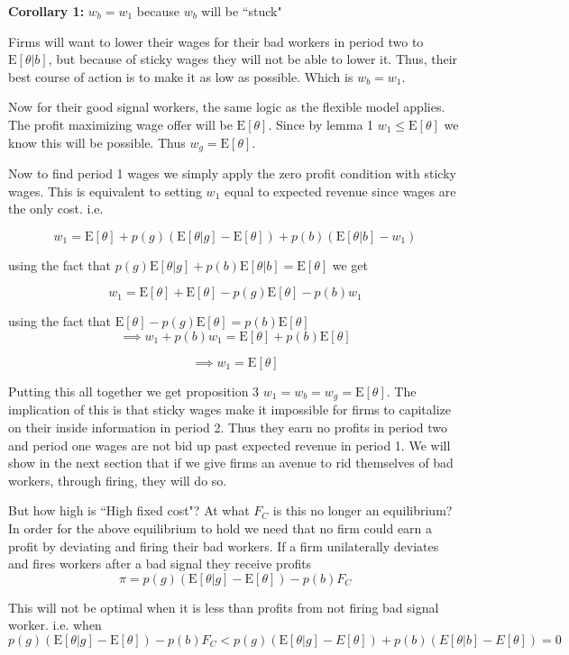 \documentclass[11pt]{article}
\newcommand{\E}{\mathrm{E}}
\begin{document}
 \textbf{Corollary 1:} $w_b = w_1$ because $w_b$ will be ``stuck"

Firms will want to lower their wages for their bad workers in period two to $\E[\theta |b]$, but because of sticky wages they will not be able to lower it. Thus, their best course of action is to make it as low as possible. Which is $w_b = w_1$. \par 

Now for their good signal workers, the same logic as the flexible model applies. The profit maximizing wage offer will be $\E[\theta]$. Since by lemma 1  $w_1 \leq \E[\theta]$ we know this will be possible. Thus $w_g = \E[\theta]$. \par 

Now to find period 1 wages we simply apply the zero profit condition with sticky wages. This is equivalent to setting $w_1$ equal to expected revenue since wages are the only cost. i.e. 

$$ w_1 = \E[\theta] + p(g)(\E[\theta|g] - \E[\theta]) + p(b)(\E[\theta|b] - w_1) $$

using the fact that $p(g)\E[\theta|g] + p(b)\E[\theta|b] = \E[\theta]$ we get 

$$ w_1 = \E[\theta] + \E[\theta] - p(g)\E[\theta] - p(b)w_1$$

using the fact that $ \E[\theta] - p(g)\E[\theta] = p(b)\E[\theta]$
$$ \implies w_1 +p(b)w_1 = \E[\theta] + p(b)\E[\theta]
$$

$$ \implies w_1 = \E[\theta]$$

Putting this all together we get proposition 3 $w_1 = w_b = w_g =\E[\theta]$. The implication of this is that sticky wages make it impossible for firms to capitalize on their inside information in period 2. Thus they earn no profits in period two and period one wages are not bid up past expected revenue in period 1. We will show in the next section that if we give firms an avenue to rid themselves of bad workers, through firing, they will do so. \par 

But how high is ``High fixed cost"? At what $F_C$ is this no longer an equilibrium? In order for the above equilibrium to hold we need that no firm could earn a profit by deviating and firing their bad workers. If a firm unilaterally deviates and fires workers after a bad signal they receive profits 
$$ \pi = p(g) (\E[\theta|g] - \E[\theta]) - p(b)F_C $$

This will not be optimal when it is less than profits from not firing bad signal worker. i.e. when 
$$  p(g) (\E[\theta|g] - \E[\theta]) - p(b)F_C < p(g)( \E[\theta|g] - E[\theta]) + p(b)(E[\theta|b] - E[\theta]) = 0 $$  
\end{document}
